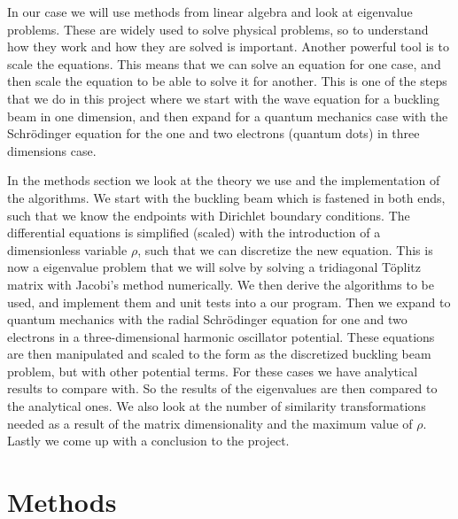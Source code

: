 \documentclass[12pt,a4paper,english]{article}
\begin{document}
In our case we will use methods from linear algebra and look at eigenvalue problems. These are widely used to solve physical problems, so to understand how they work and how they are solved is important. Another powerful tool is to scale the equations. This means that we can solve an equation for one case, and then scale the equation to be able to solve it for another. This is one of the steps that we do in this project where we start with the wave equation for a buckling beam in one dimension, and then expand for a quantum mechanics case with the Schrödinger equation for the one and two electrons (quantum dots) in three dimensions case.

In the methods section we look at the theory we use and the implementation of the algorithms. We start with the buckling beam which is fastened in both ends, such that we know the endpoints with Dirichlet boundary conditions. The differential equations is simplified (scaled) with the introduction of a dimensionless variable $\rho$, such that we can discretize the new equation. This is now a eigenvalue problem that we will solve by solving a tridiagonal Töplitz matrix with Jacobi's method numerically. We then derive the algorithms to be used, and implement them and unit tests into a our program. Then we expand to quantum mechanics with the radial Schrödinger equation for one and two electrons in a three-dimensional harmonic oscillator potential. These equations are then manipulated and scaled to the form as the discretized buckling beam problem, but with other potential terms. For these cases we have analytical results to compare with. So the results of the eigenvalues are then compared to the analytical ones. We also look at the number of similarity transformations needed as a result of the matrix dimensionality and the maximum value of $\rho$. Lastly we come up with a conclusion to the project.

\section{Methods}
\end{document}
